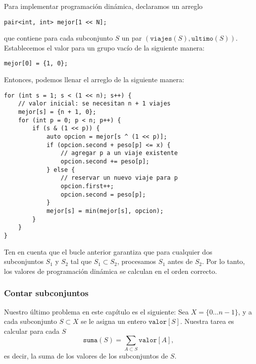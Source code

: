 Para implementar programación dinámica,
declaramos un arreglo
\begin{lstlisting}
pair<int, int> mejor[1 << N];
\end{lstlisting}
que contiene para cada subconjunto $S$
un par $(\texttt{viajes}(S),\texttt{ultimo}(S))$.
Establecemos el valor para un grupo vacío de la siguiente manera:
\begin{lstlisting}
mejor[0] = {1, 0};
\end{lstlisting}
Entonces, podemos llenar el arreglo de la siguiente manera:

\begin{lstlisting}
for (int s = 1; s < (1 << n); s++) {
    // valor inicial: se necesitan n + 1 viajes
    mejor[s] = {n + 1, 0};
    for (int p = 0; p < n; p++) {
        if (s & (1 << p)) {
            auto opcion = mejor[s ^ (1 << p)];
            if (opcion.second + peso[p] <= x) {
                // agregar p a un viaje existente
                opcion.second += peso[p];
            } else {
                // reservar un nuevo viaje para p
                opcion.first++;
                opcion.second = peso[p];
            }
            mejor[s] = min(mejor[s], opcion);
        }
    }
}
\end{lstlisting}
Ten en cuenta que el bucle anterior garantiza que
para cualquier dos subconjuntos $S_1$ y $S_2$
tal que $S_1 \subset S_2$, procesamos $S_1$ antes de $S_2$.
Por lo tanto, los valores de programación dinámica se calculan en el
orden correcto.

\subsubsection{Contar subconjuntos}

Nuestro último problema en este capítulo es el siguiente:
Sea $X=\{0 \ldots n-1\}$, y a cada subconjunto $S \subset X$
se le asigna un entero $\texttt{valor}[S]$.
Nuestra tarea es calcular para cada $S$
\[\texttt{suma}(S) = \sum_{A \subset S} \texttt{valor}[A],\]
es decir, la suma de los valores de los subconjuntos de $S$.

